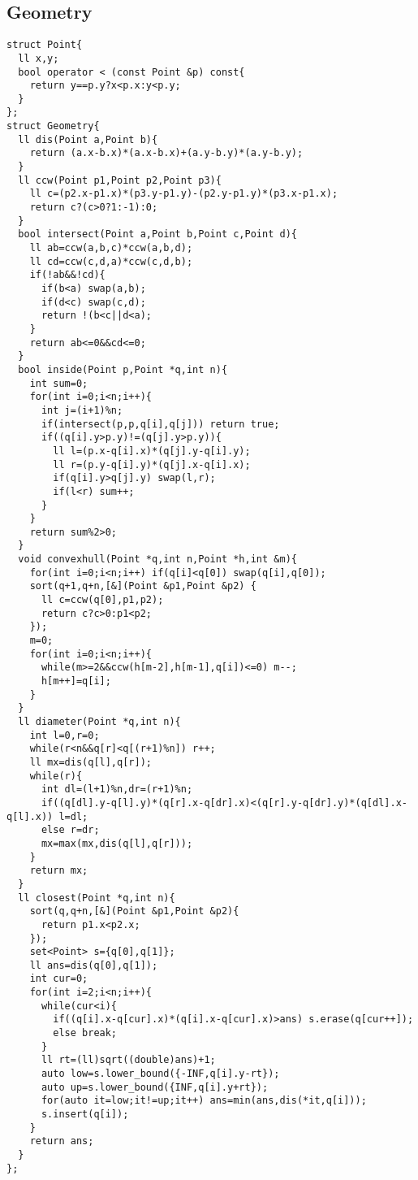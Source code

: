 \documentclass[landscape, 8pt, a4paper, oneside, twocolumn]{extarticle}
\begin{document}
\subsection{Geometry}
\begin{verbatim}
struct Point{
  ll x,y;
  bool operator < (const Point &p) const{
    return y==p.y?x<p.x:y<p.y;
  }
};
struct Geometry{
  ll dis(Point a,Point b){
    return (a.x-b.x)*(a.x-b.x)+(a.y-b.y)*(a.y-b.y);
  }
  ll ccw(Point p1,Point p2,Point p3){
    ll c=(p2.x-p1.x)*(p3.y-p1.y)-(p2.y-p1.y)*(p3.x-p1.x);
    return c?(c>0?1:-1):0;
  }
  bool intersect(Point a,Point b,Point c,Point d){
    ll ab=ccw(a,b,c)*ccw(a,b,d);
    ll cd=ccw(c,d,a)*ccw(c,d,b);
    if(!ab&&!cd){
      if(b<a) swap(a,b);
      if(d<c) swap(c,d);
      return !(b<c||d<a); 
    }
    return ab<=0&&cd<=0;
  }
  bool inside(Point p,Point *q,int n){
    int sum=0;
    for(int i=0;i<n;i++){
      int j=(i+1)%n;
      if(intersect(p,p,q[i],q[j])) return true;
      if((q[i].y>p.y)!=(q[j].y>p.y)){
        ll l=(p.x-q[i].x)*(q[j].y-q[i].y);
        ll r=(p.y-q[i].y)*(q[j].x-q[i].x);
        if(q[i].y>q[j].y) swap(l,r);
        if(l<r) sum++;
      }
    }
    return sum%2>0;
  }
  void convexhull(Point *q,int n,Point *h,int &m){
    for(int i=0;i<n;i++) if(q[i]<q[0]) swap(q[i],q[0]);
    sort(q+1,q+n,[&](Point &p1,Point &p2) {
      ll c=ccw(q[0],p1,p2);
      return c?c>0:p1<p2;
    });
    m=0;
    for(int i=0;i<n;i++){
      while(m>=2&&ccw(h[m-2],h[m-1],q[i])<=0) m--;
      h[m++]=q[i];
    }
  }
  ll diameter(Point *q,int n){
    int l=0,r=0;
    while(r<n&&q[r]<q[(r+1)%n]) r++;
    ll mx=dis(q[l],q[r]);
    while(r){
      int dl=(l+1)%n,dr=(r+1)%n;
      if((q[dl].y-q[l].y)*(q[r].x-q[dr].x)<(q[r].y-q[dr].y)*(q[dl].x-q[l].x)) l=dl;
      else r=dr;
      mx=max(mx,dis(q[l],q[r]));
    }
    return mx;
  }
  ll closest(Point *q,int n){
    sort(q,q+n,[&](Point &p1,Point &p2){
      return p1.x<p2.x;
    });
    set<Point> s={q[0],q[1]};
    ll ans=dis(q[0],q[1]);
    int cur=0;
    for(int i=2;i<n;i++){
      while(cur<i){
        if((q[i].x-q[cur].x)*(q[i].x-q[cur].x)>ans) s.erase(q[cur++]);
        else break;
      }
      ll rt=(ll)sqrt((double)ans)+1;
      auto low=s.lower_bound({-INF,q[i].y-rt});
      auto up=s.lower_bound({INF,q[i].y+rt});
      for(auto it=low;it!=up;it++) ans=min(ans,dis(*it,q[i]));
      s.insert(q[i]);
    }
    return ans;
  }
};
\end{verbatim}
\end{document}
